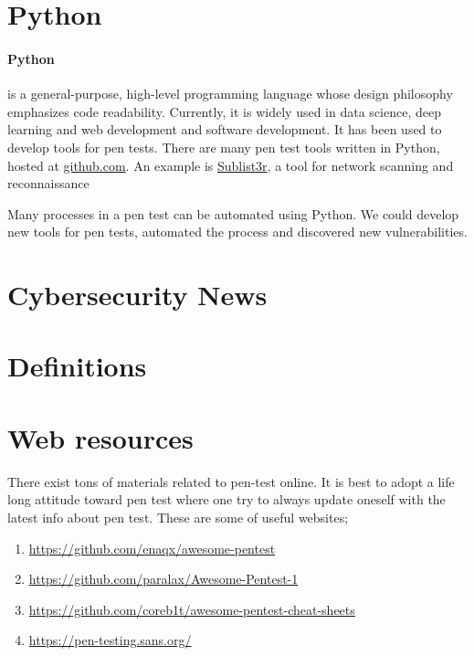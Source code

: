 \documentclass[7x9]{times}
\begin{document}

\section{Python}

\paragraph{Python}\cite{van2007python,lutz2013learning,lutz2010programming}
is a general-purpose, high-level programming language whose design
philosophy emphasizes code readability. Currently, it is widely used
in data science, deep learning and web development and software
development. It has been used to develop tools for pen tests.  There
are many pen test tools written in Python, hosted at
\url{github.com}. An example is \url{Sublist3r}, a tool for network
scanning and reconnaissance 


Many processes in a pen test can be automated using Python. We could develop 
new tools for pen tests, automated the
process and discovered new vulnerabilities.


%

\section{Cybersecurity News}

\section{Definitions}

\section{Web resources}

There exist tons of materials related to pen-test online. It is best to adopt
a life long attitude toward pen test where one try to always update oneself
with the latest info about pen test. These are some of useful websites;
\begin{enumerate}
\item \url{https://github.com/enaqx/awesome-pentest}
\item \url{https://github.com/paralax/Awesome-Pentest-1}
\item \url{https://github.com/coreb1t/awesome-pentest-cheat-sheets}
\item \url{https://pen-testing.sans.org/}
\end{enumerate}
\end{document}
